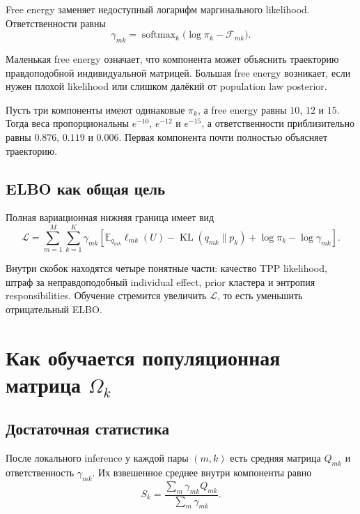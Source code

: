 \documentclass[12pt,a4paper]{article}
\DeclareMathOperator{\softmax}{softmax}
\DeclareMathOperator{\KL}{KL}
\newcommand{\E}{\mathbb{E}}
\newenvironment{examplebox}{\par\medskip\noindent{\color{orange}\bfseries Численный пример. }\ignorespaces}{\par\medskip}
\begin{document}
Free energy заменяет недоступный логарифм маргинального likelihood. Ответственности равны
\begin{equation}
\gamma_{mk}=\softmax_k\bigl(\log\pi_k-\mathcal F_{mk}\bigr).
\label{eq:responsibilities}
\end{equation}

Маленькая free energy означает, что компонента может объяснить траекторию правдоподобной индивидуальной матрицей. Большая free energy возникает, если нужен плохой likelihood или слишком далёкий от population law posterior.

\begin{examplebox}
Пусть три компоненты имеют одинаковые \(\pi_k\), а free energy равны \(10\), \(12\) и \(15\). Тогда веса пропорциональны \(e^{-10}\), \(e^{-12}\) и \(e^{-15}\), а ответственности приблизительно равны \(0.876\), \(0.119\) и \(0.006\). Первая компонента почти полностью объясняет траекторию.
\end{examplebox}

\subsection{ELBO как общая цель}

Полная вариационная нижняя граница имеет вид
\begin{equation}
\mathcal L=\sum_{m=1}^{M}\sum_{k=1}^{K}\gamma_{mk}\left[\E_{q_{mk}}\ell_{mk}(U)-\KL(q_{mk}\|p_k)+\log\pi_k-\log\gamma_{mk}\right].
\label{eq:elbo}
\end{equation}

Внутри скобок находятся четыре понятные части: качество TPP likelihood, штраф за неправдоподобный individual effect, prior кластера и энтропия responsibilities. Обучение стремится увеличить \(\mathcal L\), то есть уменьшить отрицательный ELBO.

\section{Как обучается популяционная матрица \texorpdfstring{\(\Omega_k\)}{Omega}}

\subsection{Достаточная статистика}

После локального inference у каждой пары \((m,k)\) есть средняя матрица \(Q_{mk}\) и ответственность \(\gamma_{mk}\). Их взвешенное среднее внутри компоненты равно
\begin{equation}
S_k=\frac{\sum_m\gamma_{mk}Q_{mk}}{\sum_m\gamma_{mk}}.
\label{eq:sufficient-statistic}
\end{equation}
\end{document}
